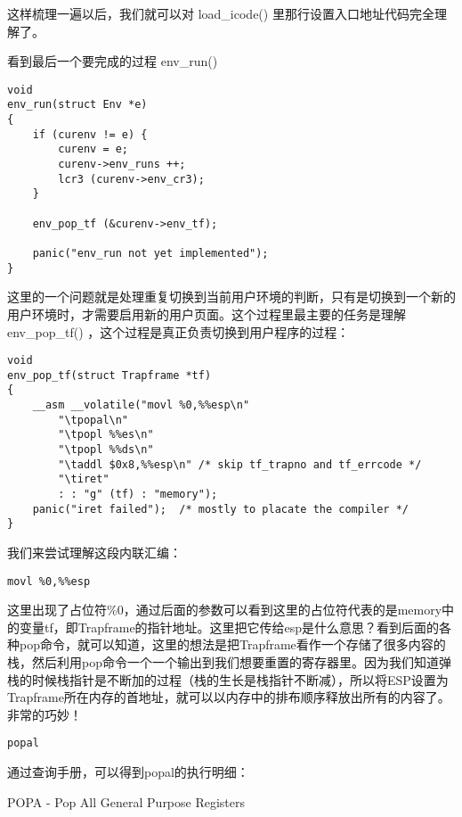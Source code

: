 \documentclass{article}
\newcommand{\funcname}[1]{{\ttfamily \small #1}}
\begin{document}
\begin{CJK*}{UTF8}{gkai}
这样梳理一遍以后，我们就可以对 \funcname{load\_icode()} 里那行设置入口地址代码完全理解了。

看到最后一个要完成的过程 \funcname{env\_run()}


\begin{lstlisting}[style=ccode, title={\scriptsize \ttfamily \bfseries kern/env.c: env\_run()}]
void
env_run(struct Env *e)
{
    if (curenv != e) {
        curenv = e;
        curenv->env_runs ++;
        lcr3 (curenv->env_cr3);
    }

    env_pop_tf (&curenv->env_tf);

	panic("env_run not yet implemented");
}
\end{lstlisting}

这里的一个问题就是处理重复切换到当前用户环境的判断，只有是切换到一个新的用户环境时，才需要启用新的用户页面。这个过程里最主要的任务是理解 \funcname{env\_pop\_tf()} ，这个过程是真正负责切换到用户程序的过程：


\begin{lstlisting}[style=ccode, title={\scriptsize \ttfamily \bfseries kern/env.c: env\_pop\_tf()}]
void
env_pop_tf(struct Trapframe *tf)
{
	__asm __volatile("movl %0,%%esp\n"
		"\tpopal\n"
		"\tpopl %%es\n"
		"\tpopl %%ds\n"
		"\taddl $0x8,%%esp\n" /* skip tf_trapno and tf_errcode */
		"\tiret"
		: : "g" (tf) : "memory");
	panic("iret failed");  /* mostly to placate the compiler */
}
\end{lstlisting}

我们来尝试理解这段内联汇编：

\begin{lstlisting}[style=acode, firstnumber=4]
        movl %0,%%esp
\end{lstlisting}

这里出现了占位符\%0，通过后面的参数可以看到这里的占位符代表的是memory中的变量tf，即Trapframe的指针地址。这里把它传给esp是什么意思？看到后面的各种pop命令，就可以知道，这里的想法是把Trapframe看作一个存储了很多内容的栈，然后利用pop命令一个一个输出到我们想要重置的寄存器里。因为我们知道弹栈的时候栈指针是不断加的过程（栈的生长是栈指针不断减），所以将ESP设置为Trapframe所在内存的首地址，就可以以内存中的排布顺序释放出所有的内容了。非常的巧妙！

\begin{lstlisting}[style=acode, firstnumber=5]
        popal
\end{lstlisting}

通过查询手册，可以得到popal的执行明细：

\begin{algorithm}[htp]
\dontprintsemicolon
{}
\caption{POPA - Pop All General Purpose Registers}
\end{algorithm}


\end{CJK*}
\end{document}
